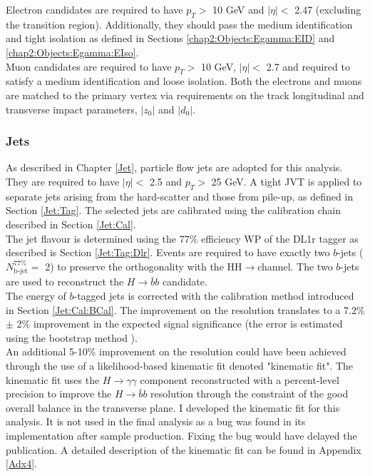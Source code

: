 Electron candidates are required to have $p_T > $ 10 GeV and $|\eta| < $ 2.47 (excluding the transition region). Additionally, they should pass the medium identification and tight isolation as defined in Sections \ref{chap2:Objects:Egamma:EID} and \ref{chap2:Objects:Egamma:EIso}. \\
Muon candidates are required to have $p_T > $ 10 GeV, $|\eta| < $ 2.7 and required to satisfy a medium identification and loose isolation. Both the electrons and muons are matched to the primary vertex via requirements on the track longitudinal and transverse impact parameters, $|z_0|$ and $|d_0|$.

\subsubsection{Jets}
\label{HHyybb:ObjEvt:Obj:Jet}
As described in Chapter \ref{Jet}, particle flow jets are adopted for this analysis. They are required to have $|\eta| < $ 2.5 and $p_T > $ 25 GeV. A tight JVT is applied to separate jets arising from the hard-scatter and those from pile-up, as defined in Section \ref{Jet:Tag}. The selected jets are calibrated using the calibration chain described in Section \ref{Jet:Cal}. \\
The jet flavour is determined using the 77\% efficiency WP of the DL1r tagger as described is Section \ref{Jet:Tag:Dlr}. Events are required to have exactly two $b$-jets ($N_{\text{b-jet}}^{77\%} = $ 2) to preserve the orthogonality with the HH$\to$\bbbb channel. The two $b$-jets are used to reconstruct the $H\to\bar{b}b$ candidate. \\
The energy of $b$-tagged jets is corrected with the calibration method introduced in Section \ref{Jet:Cal:BCal}. The improvement on the \mbb resolution translates to a 7.2\% $\pm$ 2\% improvement in the expected signal significance (the error is estimated using the bootstrap method \cite{Bootstrap}). \\

An additional 5-10\% improvement on the \mbb resolution could have been achieved through the use of a likelihood-based kinematic fit denoted "kinematic fit". The kinematic fit uses the $H\to\gamma\gamma$ component reconstructed with a percent-level precision to improve the $H\to\bar{b}b$ resolution through the constraint of the good overall balance in the transverse plane. I developed the kinematic fit for this \HHyybb analysis. It is not used in the final analysis as a bug was found in its implementation after sample production. Fixing the bug would have delayed the publication. A detailed description of the kinematic fit can be found in Appendix \ref{Adx4}. \\

